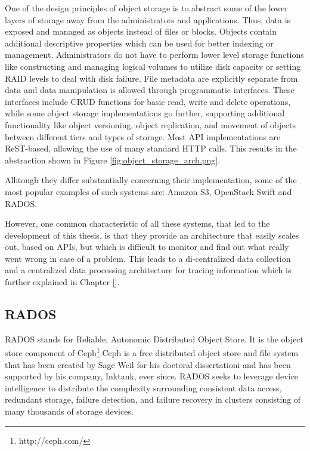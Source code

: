 One of the design principles of object storage is to abstract some of the lower
layers of storage away from the administrators and applications. Thus, data is
exposed and managed as objects instead of files or blocks. Objects contain
additional descriptive properties which can be used for better indexing or
management. Administrators do not have to perform lower level storage functions
like constructing and managing logical volumes to utilize disk capacity or
setting RAID levels to deal with disk failure. File metadata are explicitly
separate from data and data manipulation is allowed through programmatic
interfaces. These interfaces include CRUD functions for basic read, write and
delete operations, while some object storage implementations go further,
supporting additional functionality like object versioning, object replication,
and movement of objects between different tiers and types of storage. Most API
implementations are ReST-based, allowing the use of many standard HTTP calls.
This results in the abstraction shown in Figure
\ref{fig:object_storage_arch.png}.
 

Alhtough they differ substantially concerning their implementation, some of the
most popular examples of such systems are: Amazon S3, OpenStack Swift and RADOS.

However, one common characteristic of all these systems, that led to the
development of this thesis, is that they provide an architecture that easily
scales out, based on APIs, but which is difficult to monitor and find out what
really went wrong in case of a problem. This leads to a di-centralized data
collection and a centralized data processing architecture for tracing
information which is further explained in Chapter \ref{}.

\subsection{RADOS}\label{sec:rados}
RADOS stands for  Reliable, Autonomic Distributed Object Store. It is the object
store component of Ceph\footnote{http://ceph.com/}.Ceph is a free distributed
object store and file system that has been created by Sage Weil for his doctoral
dissertationi\cite{weil-thesis} and has been supported by his company, Inktank,
ever since.  RADOS seeks to leverage device intelligence to distribute the
complexity surrounding consistent data access, redundant storage, failure
detection, and failure recovery in clusters consisting of many thousands of
storage devices.

